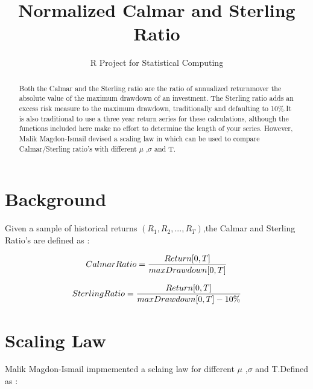 \documentclass[12pt,letterpaper,english]{article}
\title{Normalized Calmar and Sterling Ratio}
\author{R Project for Statistical Computing}
\begin{document}


\maketitle


\begin{abstract}
 Both the Calmar and the Sterling ratio are the ratio of annualized returnmover the absolute value of the maximum drawdown of an investment. The Sterling ratio adds an excess risk measure to the maximum drawdown,  traditionally and defaulting to 10\%.It is also traditional to use a three year return series for these
 calculations, although the functions included here make no effort to
 determine the length of your series. However, Malik Magdon-Ismail devised a scaling law in which can be used to compare Calmar/Sterling ratio's with different 
$\mu$ ,$\sigma$ and T.
\end{abstract}



\section{Background}
Given a sample of historical returns \((R_1,R_2, . . .,R_T)\),the Calmar and Sterling Ratio's are defined as :

  
\begin{equation}
 Calmar Ratio  =  \frac{Return [0,T]}{max Drawdown  [0,T]} \\
\end{equation}

\begin{equation}
 Sterling Ratio  =  \frac{Return [0,T]}{max Drawdown  [0,T] - 10\%} \\
\end{equation}

\section{Scaling Law}
Malik Magdon-Ismail  impmemented a sclaing law for different $\mu$ ,$\sigma$ and T.Defined as :
\end{document}
